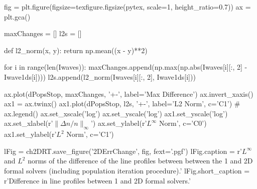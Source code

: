 \begin{pycode}[2DValidation]
fig = plt.figure(figsize=texfigure.figsize(pytex, scale=1, height_ratio=0.7))
ax = plt.gca()

maxChanges = []
l2s = []

def l2_norm(x, y):
    return np.mean((x - y)**2)

for i in range(len(Iwaves)):
    maxChanges.append(np.max(np.abs(Iwaves[i][:, 2] - Iwave1ds[i])))
    l2s.append(l2_norm(Iwaves[i][:, 2], Iwave1ds[i]))

ax.plot(dPopsStop, maxChanges, '+-', label='Max Difference')
ax.invert_xaxis()
ax1 = ax.twinx()
ax1.plot(dPopsStop, l2s, '+-', label='L2 Norm', c='C1')
# ax.legend()
ax.set_xscale('log')
ax.set_yscale('log')
ax1.set_yscale('log')
ax.set_xlabel(r'$\|\Delta n / n\|_\infty$')
ax.set_ylabel(r'$L^\infty$ Norm', c='C0')
ax1.set_ylabel(r'$L^2$ Norm', c='C1')

lFig = ch2DRT.save_figure('2DErrChange', fig, fext='.pgf')
lFig.caption = r'$L^\infty$ and $L^2$ norms of the difference of the \CaLine{} line profiles between between the 1 and 2D formal solvers (including population iteration procedure).'
lFig.short_caption = r'Difference in \CaLine{} line profiles between 1 and 2D formal solvers.'
\end{pycode}

